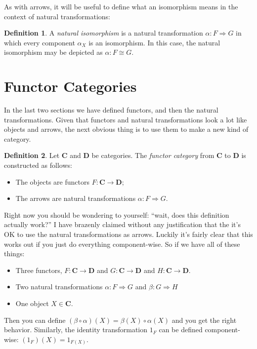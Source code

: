 \documentclass[12pt]{article}
\theoremstyle{definition}
\theoremstyle{definition}
\newtheorem{defn}{Definition}[]
\theoremstyle{definition}
\numberwithin{equation}{section}
\newcommand{\cat}[1]{\mathbf{#1}}      %
\newcommand{\CC}{\cat{C}}
\newcommand{\DD}{\cat{D}}
\newcommand{\iso}{\cong}                %
\newcommand{\fto}{\Rightarrow}
\def\ni{\goodbreak\noindent}
\begin{document}
As with arrows, it will be useful to define what an isomorphism means in the context of
natural transformations:

\begin{defn}
A {\it natural isomorphism} is a natural transformation $\alpha: F \fto G$ in which every
component $\alpha_X$ is an isomorphism. In this case, the natural isomorphism may be
depicted as $\alpha: F \iso G$.
\end{defn}

\section{Functor Categories}

In the last two sections we have defined functors, and then the natural
transformations. Given that functors and natural transformations look a lot like objects and arrows,
the next obvious thing is to use them to make a new kind of category.

\goodbreak
\begin{defn}
 Let $\CC$ and $\DD$ be categories. The \emph{functor category} from $\CC$ to $\DD$ is
 constructed as follows:
 \begin{itemize}
  \item The objects are functors $F: \CC \to \DD$;
  \item The arrows are natural transformations $\alpha:F\fto G$.
 \end{itemize}
\end{defn}
\ni
Right now you should be wondering to yourself: ``wait, does this definition actually
work?'' I have brazenly claimed without any justification that the it's OK to use the
natural transformations as arrows. Luckily it's fairly clear that this works out if you
just do everything component-wise. So if we have all of these things: 
\begin{itemize}
\item Three functors, $F: \CC \to \DD$ and $G: \CC \to \DD$ and $H:\CC \to \DD$.

\item Two natural transformations $\alpha: F \fto G$ and $\beta: G \fto H$

\item One object $X \in \CC$.
\end{itemize}
\ni
Then you can define $(\beta \circ \alpha)(X) = \beta(X) \circ \alpha(X)$ and you get the
right behavior. Similarly, the identity transformation $1_F$ can be defined
component-wise: $(1_F)(X) = 1_{F(X)}$.
\end{document}

